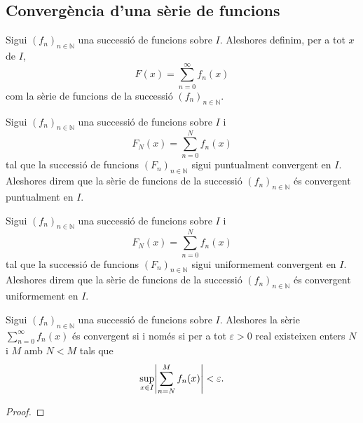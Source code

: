\documentclass[../Apunts.tex]{subfiles}
\begin{document}
	\subsection{Convergència d'una sèrie de funcions}
	\begin{definition}
		Sigui \((f_{n})_{n\in\mathbb{N}}\) una successió de funcions sobre \(I\). Aleshores definim, per a tot \(x\) de \(I\),
		\[F(x)=\sum_{n=0}^{\infty}f_{n}(x)\]
		com la sèrie de funcions de la successió \((f_{n})_{n\in\mathbb{N}}\).
	\end{definition}
	\begin{definition}
		\label{def:convergència puntual d'una sèrie de funcions}
		Sigui \((f_{n})_{n\in\mathbb{N}}\) una successió de funcions sobre \(I\) i
		\[F_{N}(x)=\sum_{n=0}^{N}f_{n}(x)\]
		tal que la successió de funcions \((F_{n})_{n\in\mathbb{N}}\) sigui puntualment convergent en \(I\). Aleshores direm que la sèrie de funcions de la successió \((f_{n})_{n\in\mathbb{N}}\) és convergent puntualment en \(I\).
	\end{definition}
	\begin{definition}
		\label{def:convergència uniforme d'una sèrie de funcions}
		Sigui \((f_{n})_{n\in\mathbb{N}}\) una successió de funcions sobre \(I\) i
		\[F_{N}(x)=\sum_{n=0}^{N}f_{n}(x)\]
		tal que la successió de funcions \((F_{n})_{n\in\mathbb{N}}\) sigui uniformement convergent en \(I\). Aleshores direm que la sèrie de funcions de la successió \((f_{n})_{n\in\mathbb{N}}\) és convergent uniformement en \(I\).
	\end{definition}
	\begin{theorem}
		\label{def:condició de Cauchy per sèries de funcions}
		Sigui \((f_{n})_{n\in\mathbb{N}}\) una successió de funcions sobre \(I\). Aleshores la sèrie \(\sum_{n=0}^{\infty}f_{n}(x)\) és convergent si i només si per a tot \(\varepsilon>0\) real existeixen enters \(N\) i \(M\) amb \(N<M\) tals que
		\[\sup_{x\in I}\abs{\sum_{n=N}^{M}f_{n}(x)}<\varepsilon.\]
		\begin{proof}
		\end{proof}
	\end{theorem}
\end{document}
